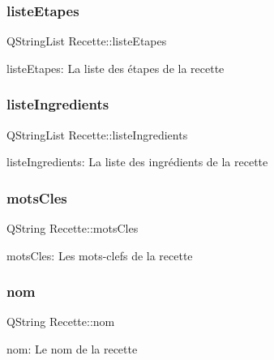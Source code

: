 \subsubsection{\texorpdfstring{liste\+Etapes}{listeEtapes}}
{\footnotesize\ttfamily Q\+String\+List Recette\+::liste\+Etapes\hspace{0.3cm}{\ttfamily [private]}}

liste\+Etapes\+: La liste des étapes de la recette \mbox{\label{classRecette_ab90a69f52a2250e1f49c4ac52b364adf}} 
\subsubsection{\texorpdfstring{liste\+Ingredients}{listeIngredients}}
{\footnotesize\ttfamily Q\+String\+List Recette\+::liste\+Ingredients\hspace{0.3cm}{\ttfamily [private]}}

liste\+Ingredients\+: La liste des ingrédients de la recette \mbox{\label{classRecette_ad17f7e5b745e0b01932acb6d6ff58dd6}} 
\subsubsection{\texorpdfstring{mots\+Cles}{motsCles}}
{\footnotesize\ttfamily Q\+String Recette\+::mots\+Cles\hspace{0.3cm}{\ttfamily [private]}}

mots\+Cles\+: Les mots-\/clefs de la recette \mbox{\label{classRecette_a8923b8c64bab1afaa4595442bc7b5803}} 
\subsubsection{\texorpdfstring{nom}{nom}}
{\footnotesize\ttfamily Q\+String Recette\+::nom\hspace{0.3cm}{\ttfamily [private]}}

nom\+: Le nom de la recette \mbox{\label{classRecette_a6165aaa32628fc48e4467f59c4cdcf99}} 
